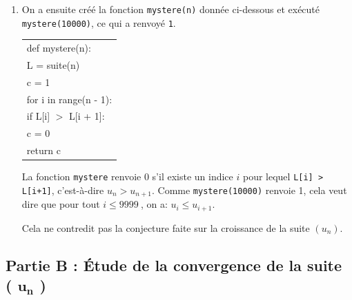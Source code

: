 \documentclass[10pt]{article}
\providecommand{\np}[2][]{{#2~#1}}
\begin{document}
\begin{enumerate}
\begin{center}
\begin{ttfamily}
\begin{tabularx}{\linewidth}{|X|}
\end{tabularx}
\end{ttfamily}
\end{center}

La suite $(u_n)$ semble croissante, mais on ne peut pas se prononcer sur sa limite.

		\item On a ensuite créé la fonction \texttt{mystere(n)} donnée ci-dessous et exécuté \linebreak \texttt{mystere(10000)}, ce qui a renvoyé \texttt{1}.



\begin{center}
		\begin{ttfamily}

\begin{tabularx}{\linewidth}{|X|}\hline
			def mystere(n):\\
			\quad L = suite(n)\\
			\quad	c = 1\\
			\quad	for i in range(n - 1):\\
			\qquad	if L[i] $>$ L[i + 1]:\\
			\qquad \quad c = 0\\
			\quad return c\\ \hline

\end{tabularx}
		\end{ttfamily}
		\end{center}

La fonction \texttt{mystere} renvoie 0 s'il existe un indice $i$ pour lequel \texttt{L[i] > L[i+1]}, c'est-à-dire $u_{n}>u_{n+1}$. Comme \texttt{mystere(10000)} renvoie 1, cela veut dire que pour tout $i\leqslant \np{9999}$, on a: $u_{i} \leqslant u_{i+1}$.

Cela ne contredit pas la conjecture faite sur la croissance de la suite $(u_n)$.












	\end{enumerate}

\subsection*{Partie  B : Étude de la convergence de la suite ( $\boldsymbol{u}_{\boldsymbol{n}}$ )}
\end{document}

